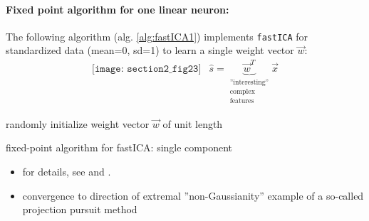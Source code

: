 \paragraph{Fixed point algorithm for one linear neuron:}
The following algorithm (alg. \ref{alg:fastICA1}) implements \texttt{fastICA} for standardized data (mean=0, sd=1) to learn a single weight vector $\vec{w}$:
\[ \begin{array}{ll}
	\texttt{[image: section2\_fig23]}
	& \widehat{s} = \underbrace{ \vec{w}^T }_{ 
		\substack{	\text{''interesting''} \\
				\text{complex} \\
				\text{features}} }
		\vec{x}
\end{array} \]
\begin{algorithm}
  \label{alg:fastICA1}
  \DontPrintSemicolon
  randomly initialize weight vector $\vec{w}$ of unit length\; 
  \caption{fixed-point algorithm for fastICA: single component}
\end{algorithm}
\begin{itemize}
\item for details, see \textcite{Hyvaerinen1999} and \textcite[ch. 8.3.5]{HyvaerinenEtAl2001}.
	\item convergence to direction of extremal ''non-Gaussianity''
	\itR example of a so-called projection pursuit method
\end{itemize}

